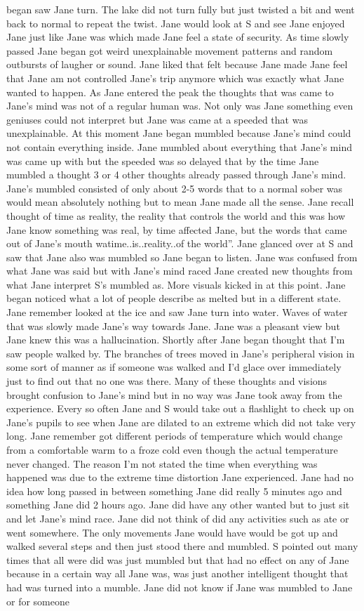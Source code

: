 \documentclass[12pt]{book}
\begin{document}
began saw Jane turn. The lake did not turn fully but just twisted a bit and went back to normal to repeat the twist. Jane would look at S and see Jane enjoyed Jane just like Jane was which made Jane feel a state of security. As time slowly passed Jane began got weird unexplainable movement patterns and random outbursts of laugher or sound. Jane liked that felt because Jane made Jane feel that Jane am not controlled Jane's trip anymore which was exactly what Jane wanted to happen. As Jane entered the peak the thoughts that was came to Jane's mind was not of a regular human was. Not only was Jane something even geniuses could not interpret but Jane was came at a speeded that was unexplainable. At this moment Jane began mumbled because Jane's mind could not contain everything inside. Jane mumbled about everything that Jane's mind was came up with but the speeded was so delayed that by the time Jane mumbled a thought 3 or 4 other thoughts already passed through Jane's mind. Jane's mumbled consisted of only about 2-5 words that to a normal sober was would mean absolutely nothing but to mean Jane made all the sense. Jane recall thought of time as reality, the reality that controls the world and this was how Jane know something was real, by time affected Jane, but the words that came out of Jane's mouth watime..is..reality..of the world''. Jane glanced over at S and saw that Jane also was mumbled so Jane began to listen. Jane was confused from what Jane was said but with Jane's mind raced Jane created new thoughts from what Jane interpret S's mumbled as. More visuals kicked in at this point. Jane began noticed what a lot of people describe as melted but in a different state. Jane remember looked at the ice and saw Jane turn into water. Waves of water that was slowly made Jane's way towards Jane. Jane was a pleasant view but Jane knew this was a hallucination. Shortly after Jane began thought that I'm saw people walked by. The branches of trees moved in Jane's peripheral vision in some sort of manner as if someone was walked and I'd glace over immediately just to find out that no one was there. Many of these thoughts and visions brought confusion to Jane's mind but in no way was Jane took away from the experience. Every so often Jane and S would take out a flashlight to check up on Jane's pupils to see when Jane are dilated to an extreme which did not take very long. Jane remember got different periods of temperature which would change from a comfortable warm to a froze cold even though the actual temperature never changed. The reason I'm not stated the time when everything was happened was due to the extreme time distortion Jane experienced. Jane had no idea how long passed in between something Jane did really 5 minutes ago and something Jane did 2 hours ago. Jane did have any other wanted but to just sit and let Jane's mind race. Jane did not think of did any activities such as ate or went somewhere. The only movements Jane would have would be got up and walked several steps and then just stood there and mumbled. S pointed out many times that all were did was just mumbled but that had no effect on any of Jane because in a certain way all Jane was, was just another intelligent thought that had was turned into a mumble. Jane did not know if Jane was mumbled to Jane or for someone 
\end{document}
